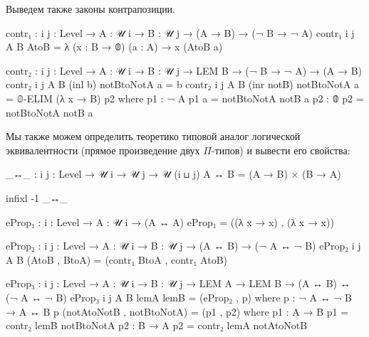 \documentclass{article}[12pt]
\begin{document}
Выведем также законы контрапозиции.
\begin{code}
contr₁ : {i j : Level} → {A : 𝒰 i} → {B : 𝒰 j}
         → (A → B) → (¬ B → ¬ A)
contr₁ {i} {j} {A} {B} AtoB = λ (x : B → 𝟘) (a : A) → x (AtoB a)

contr₂ : {i j : Level} → {A : 𝒰 i} → {B : 𝒰 j}
         → LEM B
         → (¬ B → ¬ A) → (A → B)
contr₂ {i} {j} {A} {B} (inl b) notBtoNotA a = b
contr₂ {i} {j} {A} {B} (inr notB) notBtoNotA a = 𝟘-ELIM (λ x → B) p2
    where
        p1 : ¬ A
        p1 a = notBtoNotA notB a
        p2 : 𝟘
        p2 = notBtoNotA notB a
\end{code}

Мы также можем определить теоретико типовой аналог логической эквивалентности
(прямое произведение двух $\Pi$-типов) и вывести его свойства:
\begin{code}
_↔_ : {i j : Level} → 𝒰 i → 𝒰 j → 𝒰 (i ⊔ j)
A ↔ B = (A → B) × (B → A)

infixl -1 _↔_

eProp₁ : {i : Level} → {A : 𝒰 i} → (A ↔ A)
eProp₁ = ((λ x → x) , (λ x → x))

eProp₂ : {i j : Level} → {A : 𝒰 i} → {B : 𝒰 j}
         → (A ↔ B) → (¬ A ↔ ¬ B)
eProp₂ {i} {j} {A} {B} (AtoB , BtoA) = (contr₁ BtoA , contr₁ AtoB)

eProp₃ : {i j : Level} → {A : 𝒰 i} → {B : 𝒰 j}
         → LEM A → LEM B
         → (A ↔ B) ↔ (¬ A ↔ ¬ B)
eProp₃ {i} {j} {A} {B} lemA lemB = (eProp₂ , p)
    where
        p : ¬ A ↔ ¬ B → A ↔ B
        p (notAtoNotB , notBtoNotA) = (p1 , p2)
            where
                p1 : A → B
                p1 = contr₂ lemB notBtoNotA
                p2 : B → A
                p2 = contr₂ lemA notAtoNotB
\end{code}
\end{document}
